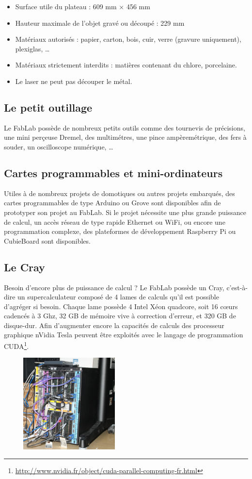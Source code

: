 \begin{itemize}
  \item Surface utile du plateau : 609 mm $\times$ 456 mm
  \item Hauteur maximale de l'objet gravé ou découpé : 229 mm
  \item Matériaux autorisés : papier, carton, bois, cuir, verre (gravure uniquement), plexiglas, \dots
  \item Matériaux strictement interdits : matières contenant du chlore, porcelaine.
  \item Le laser ne peut pas découper le métal.
\end{itemize}

\subsection{Le petit outillage}
Le FabLab possède de nombreux petits outils comme des tournevis de précisions, une mini perçeuse Dremel, des multimétres, une pince ampèremétrique, des fers à souder, un oscilloscope numérique, \dots

\subsection{Cartes programmables et mini-ordinateurs}
Utiles à de nombreux projets de domotiques ou autres projets embarqués, des cartes programmables de type Arduino ou Grove sont disponibles afin de prototyper son projet au FabLab. Si le projet nécessite une plus grande puissance de calcul, un accès réseau de type rapide Ethernet ou WiFi, ou encore une programmation complexe, des plateformes de développement Raspberry Pi ou CubieBoard sont disponibles.

\subsection{Le Cray}
Besoin d'encore plus de puissance de calcul ? Le FabLab possède un Cray, c'est-à-dire un supercalculateur composé de 4 lames de calculs qu'il est possible d'agréger si besoin. Chaque lame possède 4 Intel Xéon quadcore, soit 16 c\oe urs cadencés à 3 Ghz, 32 GB de mémoire vive à correction d'erreur, et 320 GB de disque-dur. Afin d'augmenter encore la capacités de calculs des processeur graphique nVidia Tesla peuvent être exploités avec le langage de programmation CUDA\footnote{\url{http://www.nvidia.fr/object/cuda-parallel-computing-fr.html}}.
\begin{figure}[h]
  \begin{center}
    \includegraphics[height=50mm]{Cray.jpg}
    \label{fig:cray}
  \end{center}
\end{figure}
